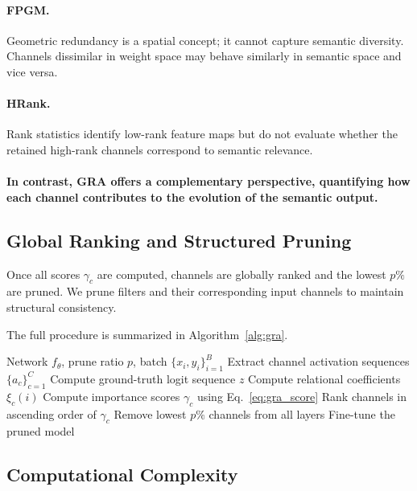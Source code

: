 \documentclass[sn-mathphys,Numbered]{sn-jnl}
\begin{document}
\paragraph{FPGM.}  
Geometric redundancy is a spatial concept; it cannot capture semantic diversity. Channels dissimilar in weight space may behave similarly in semantic space and vice versa.

\paragraph{HRank.}  
Rank statistics identify low-rank feature maps but do not evaluate whether the retained high-rank channels correspond to semantic relevance.

\paragraph{In contrast, GRA offers a complementary perspective, quantifying how each channel contributes to the evolution of the semantic output.}

\subsection{Global Ranking and Structured Pruning}

Once all scores $\gamma_{c}$ are computed, channels are globally ranked and the lowest $p\%$ are pruned. We prune filters and their corresponding input channels to maintain structural consistency.

The full procedure is summarized in Algorithm~\ref{alg:gra}.

\begin{algorithm}[t]
\caption{GRA-CNN Structured Channel Pruning}
\label{alg:gra}
\begin{algorithmic}[1]
\Require Network $f_{\theta}$, prune ratio $p$, batch $\{x_i, y_i\}_{i=1}^{B}$
\State Extract channel activation sequences $\{a_c\}_{c=1}^{C}$
\State Compute ground-truth logit sequence $z$
\State Compute relational coefficients $\xi_c(i)$
\State Compute importance scores $\gamma_c$ using Eq.~\eqref{eq:gra_score}
\State Rank channels in ascending order of $\gamma_c$
\State Remove lowest $p\%$ channels from all layers
\State Fine-tune the pruned model
\end{algorithmic}
\end{algorithm}

\subsection{Computational Complexity}
\end{document}

